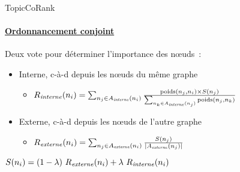 \begin{frame}[label=ordonnancement_conjoint]{TopicCoRank}\framesubtitle{\hyperlink{ordonnancement_conjoint_back}{Ordonnancement conjoint}}
  Deux vote pour déterminer l'importance des n\oe{}uds~:
  \begin{itemize}
    \item{Interne, c-à-d depuis les n\oe{}uds du même graphe}
    \begin{itemize}
      \item{\normalsize $R_{\text{\textit{interne}}}(n_i) = \sum_{n_j \in A_{\text{\textit{interne}}}(n_i)}{\frac{\text{poids}(n_j, n_i) \times S(n_j)}{\sum_{n_k \in A_{\text{\textit{interne}}}(n_j)}{{\text{poids}(n_j, n_k)}}}}$}
    \end{itemize}
    \item{Externe, c-à-d depuis les n\oe{}uds de l'autre graphe}
    \begin{itemize}
      \item{\normalsize $R_{\text{\textit{externe}}}(n_i) = \sum_{n_j \in A_{\text{\textit{externe}}}(n_i)}{\frac{S(n_j)}{|A_{\text{\textit{externe}}}(n_j)|}}$}
    \end{itemize}
  \end{itemize}

  \vspace{2em}

  \centering\Large
  $S(n_i) = (1 - \lambda)\ R_{\text{\textit{externe}}}(n_i) + \lambda\ R_{\text{\textit{interne}}}(n_i)$
\end{frame}

